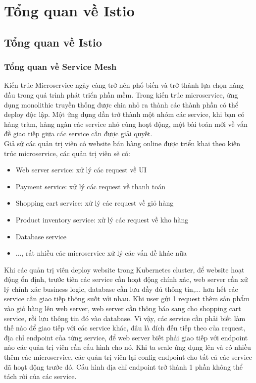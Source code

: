 \documentclass[14pt,a4paper]{book}
\begin{document}
\chapter{Tổng quan về Istio}
	\section{Tổng quan về Istio}
		\subsection{Tổng quan về Service Mesh}
			\hspace{0.6cm}Kiến trúc Microservice ngày càng trở nên phổ biến và trở thành lựa chọn hàng đầu trong quá trình phát triển phần mềm. Trong kiến trúc microservice, ứng dụng monolithic truyền thống được chia nhỏ ra thành các thành phần có thể deploy độc lập. Một ứng dụng dần trở thành một nhóm các service, khi bạn có hàng trăm, hàng ngàn các service nhỏ cùng hoạt động, một bài toán mới về vấn đề giao tiếp giữa các service cần được giải quyết.\\
			
			Giả sử các quản trị viên có website bán hàng online được triển khai theo kiến trúc microservice, các quản trị viên sẽ có:
			\begin{itemize}
				\item Web server service: xử lý các request về UI
				\item Payment service: xử lý các request về thanh toán
				\item Shopping cart service: xử lý các request về giỏ hàng
				\item Product inventory service: xử lý các request về kho hàng
				\item Database service
				\item ..., rất nhiều các microservice xử lý các vấn đề khác nữa
			\end{itemize}
		
		Khi các quản trị viên deploy website trong Kubernetes cluster, để website hoạt động ổn định, trước tiên các service cần hoạt động chính xác, web server cần xử lý chính xác business logic, database cần lưu đầy đủ thông tin,... hơn hết các service cần giao tiếp thông suốt với nhau. Khi user gửi 1 request thêm sản phẩm vào giỏ hàng lên web server, web server cần thông báo sang cho shopping cart service, rồi lưu thông tin đó vào database. Vì vậy, các service cần phải biết làm thế nào để giao tiếp với các service khác, đâu là đích đến tiếp theo của request, địa chỉ endpoint của từng service, để web server biết phải giao tiếp với endpoint nào các quản trị viên cần cấu hình cho nó. Khi ta scale ứng dụng lên và có nhiều thêm các microservice, các quản trị viên lại config endpoint cho tất cả các service đã hoạt động trước đó. Cấu hình địa chỉ endpoint trở thành 1 phần không thể tách rời của các service.
		
\end{document}
